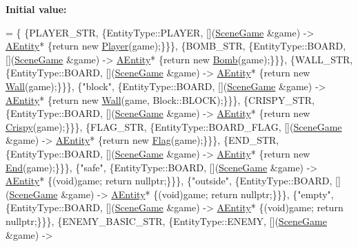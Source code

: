 {\bfseries Initial value\+:}
\begin{DoxyCode}
= \{
    \{PLAYER\_STR, \{EntityType::PLAYER, [](\hyperlink{class_scene_game}{SceneGame} &game) -> \hyperlink{class_a_entity}{AEntity}* \{\textcolor{keywordflow}{return} \textcolor{keyword}{new} 
      \hyperlink{class_player}{Player}(game);\}\}\},
    \{BOMB\_STR, \{EntityType::BOARD, [](\hyperlink{class_scene_game}{SceneGame} &game) -> \hyperlink{class_a_entity}{AEntity}* \{\textcolor{keywordflow}{return} \textcolor{keyword}{new} 
      \hyperlink{class_bomb}{Bomb}(game);\}\}\},
    \{WALL\_STR, \{EntityType::BOARD, [](\hyperlink{class_scene_game}{SceneGame} &game) -> \hyperlink{class_a_entity}{AEntity}* \{\textcolor{keywordflow}{return} \textcolor{keyword}{new} 
      \hyperlink{class_wall}{Wall}(game);\}\}\},
    \{\textcolor{stringliteral}{"block"}, \{EntityType::BOARD, [](\hyperlink{class_scene_game}{SceneGame} &game) -> \hyperlink{class_a_entity}{AEntity}* \{\textcolor{keywordflow}{return} \textcolor{keyword}{new} 
      \hyperlink{class_wall}{Wall}(game, Block::BLOCK);\}\}\},
    \{CRISPY\_STR, \{EntityType::BOARD, [](\hyperlink{class_scene_game}{SceneGame} &game) -> \hyperlink{class_a_entity}{AEntity}* \{\textcolor{keywordflow}{return} \textcolor{keyword}{new} 
      \hyperlink{class_crispy}{Crispy}(game);\}\}\},
    \{FLAG\_STR, \{EntityType::BOARD\_FLAG, [](\hyperlink{class_scene_game}{SceneGame} &game) -> \hyperlink{class_a_entity}{AEntity}* \{\textcolor{keywordflow}{return} \textcolor{keyword}{new} 
      \hyperlink{class_flag}{Flag}(game);\}\}\},
    \{END\_STR, \{EntityType::BOARD, [](\hyperlink{class_scene_game}{SceneGame} &game) -> \hyperlink{class_a_entity}{AEntity}* \{\textcolor{keywordflow}{return} \textcolor{keyword}{new} 
      \hyperlink{class_end}{End}(game);\}\}\},
    \{\textcolor{stringliteral}{"safe"}, \{EntityType::BOARD, [](\hyperlink{class_scene_game}{SceneGame} &game) -> \hyperlink{class_a_entity}{AEntity}* \{(void)game; \textcolor{keywordflow}{return} \textcolor{keyword}{
      nullptr};\}\}\},
    \{\textcolor{stringliteral}{"outside"}, \{EntityType::BOARD, [](\hyperlink{class_scene_game}{SceneGame} &game) -> \hyperlink{class_a_entity}{AEntity}* \{(void)game; \textcolor{keywordflow}{return} \textcolor{keyword}{
      nullptr};\}\}\},
    \{\textcolor{stringliteral}{"empty"}, \{EntityType::BOARD, [](\hyperlink{class_scene_game}{SceneGame} &game) -> \hyperlink{class_a_entity}{AEntity}* \{(void)game; \textcolor{keywordflow}{return} \textcolor{keyword}{
      nullptr};\}\}\},
    \{ENEMY\_BASIC\_STR, \{EntityType::ENEMY, [](\hyperlink{class_scene_game}{SceneGame} &game) -> 

\end{DoxyCode}
